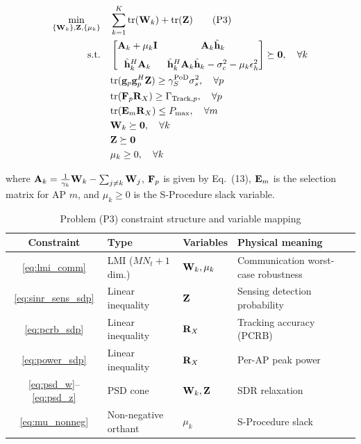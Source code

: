 \begin{align}
\min_{\{\mathbf{W}_k\}, \mathbf{Z}, \{\mu_k\}} \quad & \sum_{k=1}^K \text{tr}(\mathbf{W}_k) + \text{tr}(\mathbf{Z}) \tag{P3} \\
\text{s.t.} \quad & \begin{bmatrix} \mathbf{A}_k + \mu_k \mathbf{I} & \mathbf{A}_k \hat{\mathbf{h}}_k \\[1.5ex] \hat{\mathbf{h}}_k^H \mathbf{A}_k & \hat{\mathbf{h}}_k^H \mathbf{A}_k \hat{\mathbf{h}}_k - \sigma_c^2 - \mu_k \epsilon_h^2 \end{bmatrix} \succeq \mathbf{0}, \quad \forall k \label{eq:lmi_comm} \\
& \text{tr}(\mathbf{g}_p \mathbf{g}_p^H \mathbf{Z}) \geq \gamma_S^{\text{PoD}} \sigma_s^2, \quad \forall p \label{eq:sinr_sens_sdp} \\
& \text{tr}(\mathbf{F}_p \mathbf{R}_X) \geq \Gamma_{\text{Track},p}, \quad \forall p \label{eq:pcrb_sdp} \\
& \text{tr}(\mathbf{E}_m \mathbf{R}_X) \leq P_{\max}, \quad \forall m \label{eq:power_sdp} \\
& \mathbf{W}_k \succeq \mathbf{0}, \quad \forall k \label{eq:psd_w} \\
& \mathbf{Z} \succeq \mathbf{0} \label{eq:psd_z} \\
& \mu_k \geq 0, \quad \forall k \label{eq:mu_nonneg}
\end{align}

where $\mathbf{A}_k = \frac{1}{\gamma_k} \mathbf{W}_k - \sum_{j \neq k} \mathbf{W}_j$, $\mathbf{F}_p$ is given by Eq.~(13), $\mathbf{E}_m$ is the selection matrix for AP $m$, and $\mu_k \geq 0$ is the S-Procedure slack variable.

\begin{table}[htbp]
\centering
\caption{Problem (P3) constraint structure and variable mapping}\label{tab:p3_structure}
\begin{tabular}{clll}
\toprule
Constraint & Type & Variables & Physical meaning \\
\midrule
\eqref{eq:lmi_comm} & LMI ($MN_t+1$ dim.) & $\mathbf{W}_k, \mu_k$ & Communication worst-case robustness \\
\eqref{eq:sinr_sens_sdp} & Linear inequality & $\mathbf{Z}$ & Sensing detection probability \\
\eqref{eq:pcrb_sdp} & Linear inequality & $\mathbf{R}_X$ & Tracking accuracy (PCRB) \\
\eqref{eq:power_sdp} & Linear inequality & $\mathbf{R}_X$ & Per-AP peak power \\
\eqref{eq:psd_w}--\eqref{eq:psd_z} & PSD cone & $\mathbf{W}_k, \mathbf{Z}$ & SDR relaxation \\
\eqref{eq:mu_nonneg} & Non-negative orthant & $\mu_k$ & S-Procedure slack \\
\bottomrule
\end{tabular}
\end{table}

